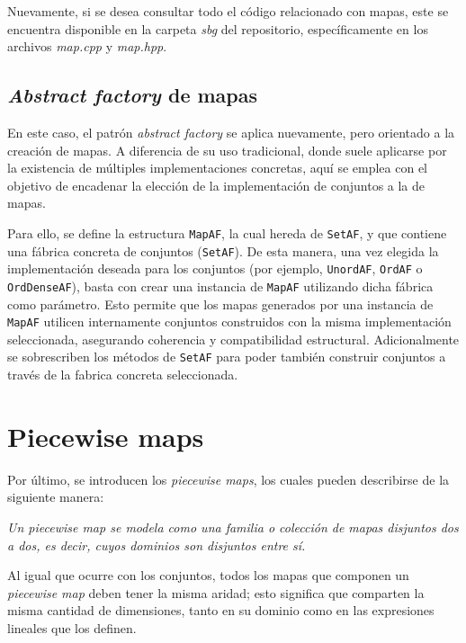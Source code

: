 Nuevamente, si se desea consultar todo el código relacionado con mapas, este se encuentra disponible en la carpeta \textit{sbg} del repositorio, específicamente en los archivos \textit{map.cpp} y \textit{map.hpp}.

\subsection{\textit{Abstract factory} de mapas}

En este caso, el patrón \textit{abstract factory} se aplica nuevamente, pero orientado a la creación de mapas. A diferencia de su uso tradicional, donde suele aplicarse por la existencia de múltiples implementaciones concretas, aquí se emplea con el objetivo de encadenar la elección de la implementación de conjuntos a la de mapas.

Para ello, se define la estructura \texttt{MapAF}, la cual hereda de \texttt{SetAF}, y que contiene una fábrica concreta de conjuntos (\texttt{SetAF}). De esta manera, una vez elegida la implementación deseada para los conjuntos (por ejemplo, \texttt{UnordAF}, \texttt{OrdAF} o \texttt{OrdDenseAF}), basta con crear una instancia de \texttt{MapAF} utilizando dicha fábrica como parámetro. Esto permite que los mapas generados por una instancia de \texttt{MapAF} utilicen internamente conjuntos construidos con la misma implementación seleccionada, asegurando coherencia y compatibilidad estructural. Adicionalmente se sobrescriben los métodos de \texttt{SetAF} para poder también construir conjuntos a través de la fabrica concreta seleccionada.



\section{Piecewise maps}

Por último, se introducen los \textit{piecewise maps}, los cuales pueden describirse de la siguiente manera:

\begin{center}
    \textit{Un \textit{piecewise map} se modela como una familia o colección de mapas disjuntos dos a dos, es decir, cuyos dominios son disjuntos entre sí.}
\end{center}

Al igual que ocurre con los conjuntos, todos los mapas que componen un \textit{piecewise map} deben tener la misma aridad; esto significa que comparten la misma cantidad de dimensiones, tanto en su dominio como en las expresiones lineales que los definen.

